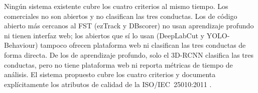 Ningún sistema existente cubre los cuatro criterios al mismo tiempo. Los comerciales no
son abiertos y no clasifican las tres conductas. Los de código abierto más cercanos
al FST (ezTrack y DBscorer) no usan aprendizaje profundo ni tienen interfaz web;
los abiertos que sí lo usan (DeepLabCut y YOLO-Behaviour) tampoco ofrecen plataforma web
ni clasifican las tres conductas de forma directa. De los de aprendizaje profundo,
solo el 3D-RCNN clasifica las tres conductas, pero no tiene plataforma web ni reporta
métricas de tiempo de análisis. El sistema propuesto cubre los cuatro criterios y
documenta explícitamente los atributos de calidad de la ISO/IEC~25010:2011
\cite{iso25010}.